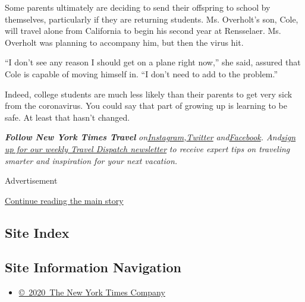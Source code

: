 Some parents ultimately are deciding to send their offspring to school
by themselves, particularly if they are returning students. Ms.
Overholt's son, Cole, will travel alone from California to begin his
second year at Rensselaer. Ms. Overholt was planning to accompany him,
but then the virus hit.

``I don't see any reason I should get on a plane right now,'' she said,
assured that Cole is capable of moving himself in. ``I don't need to add
to the problem.''

Indeed, college students are much less likely than their parents to get
very sick from the coronavirus. You could say that part of growing up is
learning to be safe. At least that hasn't changed.

\emph{\textbf{Follow New York Times Travel}}
\emph{on}\href{https://www.instagram.com/nytimestravel/}{\emph{Instagram}}\emph{,}\href{https://twitter.com/nytimestravel}{\emph{Twitter}}
\emph{and}\href{https://www.facebook.com/nytimestravel/}{\emph{Facebook}}\emph{.
And}\href{https://www.nytimes.com/newsletters/traveldispatch}{\emph{sign
up for our weekly Travel Dispatch newsletter}} \emph{to receive expert
tips on traveling smarter and inspiration for your next vacation.}

Advertisement

\protect\hyperlink{after-bottom}{Continue reading the main story}

\hypertarget{site-index}{%
\subsection{Site Index}\label{site-index}}

\hypertarget{site-information-navigation}{%
\subsection{Site Information
Navigation}\label{site-information-navigation}}

\begin{itemize}
\tightlist
\item
  \href{https://help.nytimes.com/hc/en-us/articles/115014792127-Copyright-notice}{©~2020~The
  New York Times Company}
\end{itemize}


